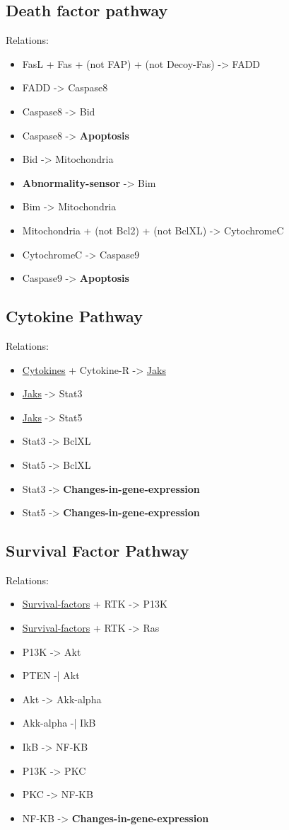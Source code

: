 \documentclass[11pt]{article}
\begin{document}
\subsection{Death factor pathway}
\label{sec-7-4}
Relations:
\begin{itemize}
\item FasL + Fas + (not FAP) + (not Decoy-Fas) -> FADD
\item FADD -> Caspase8
\item Caspase8 -> Bid
\item Caspase8 -> \textbf{Apoptosis}
\item Bid -> Mitochondria
\item \textbf{Abnormality-sensor} -> Bim
\item Bim -> Mitochondria
\item Mitochondria + (not Bcl2) + (not BclXL) -> CytochromeC
\item CytochromeC -> Caspase9
\item Caspase9 -> \textbf{Apoptosis}
\end{itemize}
\subsection{Cytokine Pathway}
\label{sec-7-5}
Relations:
\begin{itemize}
\item \uline{Cytokines} + Cytokine-R -> \uline{Jaks}
\item \uline{Jaks} -> Stat3
\item \uline{Jaks} -> Stat5
\item Stat3 -> BclXL
\item Stat5 -> BclXL
\item Stat3 -> \textbf{Changes-in-gene-expression}
\item Stat5 -> \textbf{Changes-in-gene-expression}
\end{itemize}
\subsection{Survival Factor Pathway}
\label{sec-7-6}
Relations:
\begin{itemize}
\item \uline{Survival-factors} + RTK -> P13K
\item \uline{Survival-factors} + RTK -> Ras
\item P13K -> Akt
\item PTEN -| Akt
\item Akt -> Akk-alpha
\item Akk-alpha -| IkB
\item IkB -> NF-KB
\item P13K -> PKC
\item PKC -> NF-KB
\item NF-KB -> \textbf{Changes-in-gene-expression}
\end{itemize}
\end{document}
